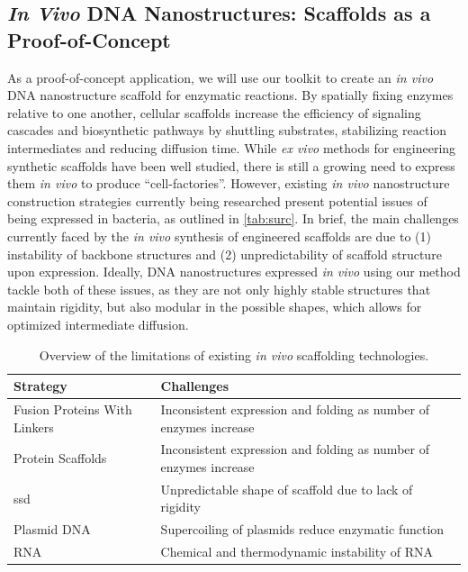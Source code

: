 \documentclass[a4paper]{article}
\begin{document}
\subsection*{\textit{In Vivo} DNA Nanostructures: Scaffolds as a Proof-of-Concept}
As a proof-of-concept application, we will use our toolkit to create an \textit{in vivo} DNA nanostructure scaffold for enzymatic reactions.
By spatially fixing enzymes relative to one another, cellular scaffolds increase the efficiency of signaling cascades and biosynthetic pathways by shuttling substrates, stabilizing reaction intermediates and reducing diffusion time\cite{intro8,intro9}.
While \textit{ex vivo} methods for engineering synthetic scaffolds have been well studied, there is still a growing need to express them \textit{in vivo} to produce “cell-factories”\cite{tab7}.
However, existing \textit{in vivo} nanostructure construction strategies currently being researched present potential issues of being expressed in bacteria, as outlined in \autoref{tab:surc}.
In brief, the main challenges currently faced by the \textit{in vivo} synthesis of engineered scaffolds are due to (1) instability of backbone structures and (2) unpredictability of scaffold structure upon expression.
Ideally, DNA nanostructures expressed \textit{in vivo} using our method tackle both of these issues, as they are not only highly stable structures that maintain rigidity, but also modular in the possible shapes, which allows for optimized intermediate diffusion\cite{intro1}.
\begin{table}[h!]
    \centering
    \begin{tabulary}{\linewidth}{l l}
        \bottomrule
        \textbf{Strategy} & \textbf{Challenges} \\
        \midrule
        Fusion Proteins With Linkers & Inconsistent expression and folding as number of enzymes increase\cite{tab1,tab2}\\
        Protein Scaffolds & Inconsistent expression and folding as number of enzymes increase\cite{tab3,tab4,tab5,intro16}\\
        \ac{ssd} & Unpredictable shape of scaffold due to lack of rigidity\cite{tab7,tab8}\\
        Plasmid DNA & Supercoiling of plasmids reduce enzymatic function\cite{tab9,tab10}\\
        RNA & Chemical and thermodynamic instability of RNA\cite{tab11,tab12}\\
        \bottomrule
    \end{tabulary}
    \caption{Overview of the limitations of existing \textit{in vivo} scaffolding technologies.}
    \label{tab:surc}
\end{table}
\end{document}

